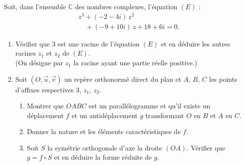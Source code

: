 \documentclass{axiobac}
\begin{document}
\begin{exercice}{}

Soit, dans l'ensemble $\mathbb{C}$ des nombres complexes, l'équation $(E)$ :
\[
\begin{aligned}
& z^3 + (-2 - 4i)\,z^2 \\
& \quad + (-9 + 10i)\,z + 18 + 6i = 0 .
\end{aligned}
\]

\begin{enumerate}
    \item Vérifier que $3$ est une racine de l'équation $(E)$ et en déduire les autres racines $z_1$ et $z_2$ de $(E)$. \\
    (On désigne par $z_1$ la racine ayant une partie réelle positive.)
    \item Soit $(O, \vec{u}, \vec{v})$ un repère orthonormé direct du plan et $A$, $B$, $C$ les points d'affixes respectives $3$, $z_1$, $z_2$.
    \begin{enumerate}
        \item Montrer que $OABC$ est un parallélogramme et qu'il existe un déplacement $f$ et un antidéplacement $g$ transformant $O$ en $B$ et $A$ en $C$.
        \item Donner la nature et les éléments caractéristiques de $f$.
        \item Soit $S$ la symétrie orthogonale d'axe la droite $(OA)$. Vérifier que $g = f \circ S$ et en déduire la forme réduite de $g$.
    \end{enumerate}
\end{enumerate}

\end{exercice}
\end{document}
